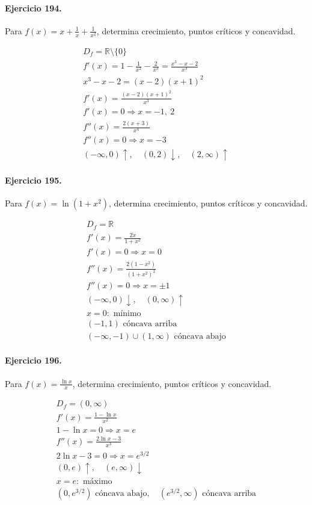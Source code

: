 \documentclass[11pt,a4paper]{article}
\begin{document}
\paragraph{Ejercicio 194.} Para $f(x)=x+\frac{1}{x}+\frac{1}{x^2}$, determina crecimiento, puntos críticos y concavidad.

\[
\begin{aligned}
D_f=\mathbb{R}\setminus\{0\}\\
f'(x)=1-\frac{1}{x^2}-\frac{2}{x^3}=\frac{x^3-x-2}{x^3}\\
x^3-x-2=(x-2)(x+1)^2\\
f'(x)=\frac{(x-2)(x+1)^2}{x^3}\\
f'(x)=0\Rightarrow x=-1,\ 2\\
f''(x)=\frac{2(x+3)}{x^4}\\
f''(x)=0\Rightarrow x=-3\\
(-\infty,0)\uparrow,\quad(0,2)\downarrow,\quad(2,\infty)\uparrow
\end{aligned}
\]


\paragraph{Ejercicio 195.} Para $f(x)=\ln(1+x^2)$, determina crecimiento, puntos críticos y concavidad.

\[
\begin{aligned}
D_f=\mathbb{R}\\
f'(x)=\frac{2x}{1+x^2}\\
f'(x)=0\Rightarrow x=0\\
f''(x)=\frac{2(1-x^2)}{(1+x^2)^2}\\
f''(x)=0\Rightarrow x=\pm1\\
(-\infty,0)\downarrow,\quad(0,\infty)\uparrow\\
x=0:\text{{ mínimo}}\\
(-1,1)\text{{ cóncava arriba}}\\
(-\infty,-1)\cup(1,\infty)\text{{ cóncava abajo}}
\end{aligned}
\]


\paragraph{Ejercicio 196.} Para $f(x)=\frac{\ln x}{x}$, determina crecimiento, puntos críticos y concavidad.

\[
\begin{aligned}
D_f=(0,\infty)\\
f'(x)=\frac{1-\ln x}{x^2}\\
1-\ln x=0\Rightarrow x=e\\
f''(x)=\frac{2\ln x-3}{x^3}\\
2\ln x-3=0\Rightarrow x=e^{3/2}\\
(0,e)\uparrow,\quad(e,\infty)\downarrow\\
x=e:\text{{ máximo}}\\
(0,e^{3/2})\text{{ cóncava abajo}},\quad(e^{3/2},\infty)\text{{ cóncava arriba}}
\end{aligned}
\]
\end{document}
